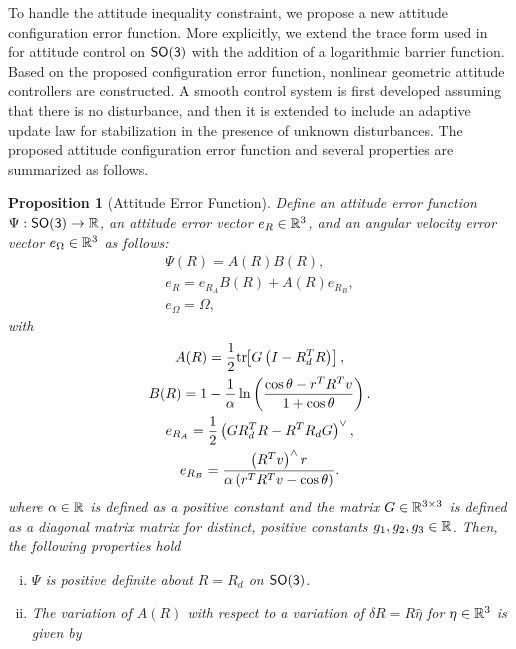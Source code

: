 \documentclass[10pt,fleqn]{IJCAS}  %
\newtheorem{prop}{Proposition}
\begin{document}
\begin{multicols}{2}
To handle the attitude inequality constraint, we propose a new attitude configuration error function. 
More explicitly, we extend the trace form used in~\cite{bullo2004,LeeITCST13} for attitude control on \(\mathsf{SO(3)}\) with the addition of a logarithmic barrier function. 
Based on the proposed configuration error function,  nonlinear geometric attitude controllers are constructed. 
A smooth control system is first developed assuming that there is  no disturbance, and then it is extended to include an adaptive update law for stabilization in the presence of unknown disturbances. 
The proposed attitude configuration error function and several properties are summarized as follows.

\begin{prop}[Attitude Error Function] \label{prop:config_error}
Define an attitude error function \( \Psi : \mathsf{SO(3)} \to \mathbb{R} \), an attitude error vector \( e_R \in \mathbb{R}^3 \), and an angular velocity error vector \( e_\Omega \in \mathbb{R}^3 \) as follows:
\begin{gather}
	\Psi(R) = A(R) B(R) , \label{eqn:psi} \\
	e_R = e_{R_A} B(R) + A(R) e_{R_B} , \label{eqn:eR} \\
	e_\Omega = \Omega , \label{eqn:eW}
\end{gather}
with
\begin{gather}
	A(R) = \frac{1}{2} \mathrm{tr}\negthickspace\left[ G \left( I - R_d^T R\right) \right] , \label{eqn:A} \\
	B(R) = 1 - \frac{1}{\alpha} \ln \left( \frac{\cos \theta -  r^T R^T v}{1 + \cos \theta}\right) . \label{eqn:B} \\
	e_{R_A} = \frac{1}{2} \left( G R_d^T R - R^T R_d G \right) ^ \vee , \label{eqn:eRA} \\
	e_{R_B} = \frac{ \left( R^T v\right)^\wedge r}{\alpha \left(r^T R^T v - \cos \theta \right)} . \label{eqn:eRB} 
\end{gather}	
where \( \alpha \in \mathbb{R} \) is defined as a positive constant and the matrix \( G \in \mathbb{R}^{3 \times 3} \) is defined as a diagonal matrix matrix for distinct, positive constants \( g_1, g_2, g_3 \in \mathbb{R} \).
Then, the following properties hold
\begin{enumerate}[(i)]
	\item \label{item:prop_psi_psd} \(\Psi\) is positive definite about \( R = R_d\) on $\mathsf{SO(3)}$.
	\item \label{item:prop_era}The variation of \( A(R) \) with respect to a variation of \( \delta R = R \hat{\eta} \) for \( \eta \in \mathbb{R}^3 \) is given by

\end{enumerate}
\end{prop}
\end{multicols}
\end{document}
